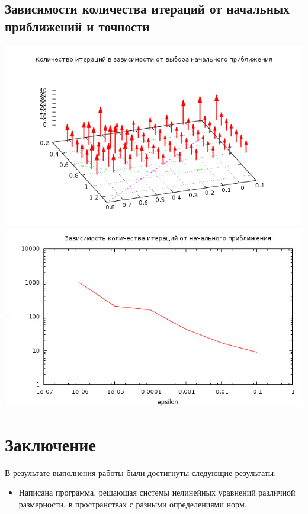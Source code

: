 \documentclass[a4paper, 12pt]{article}
\begin{document}
\subsection*{Зависимости количества итераций от начальных приближений и точности}
\includegraphics[width=\linewidth]{p0.png}
\includegraphics[width=\linewidth]{eps.jpg}
\newpage
\section*{Заключение}
В результате выполнения работы были достигнуты следующие результаты:\\
\begin{itemize}
	\item Написана программа, решающая системы нелинейных уравнений различной размерности, в пространствах с разными определениями норм.
\end{itemize}
\newpage
{}
\nocite{nm_verg_a}
\nocite{nm_verg_m}
\nocite{RH}
\nocite{RS}

\end{document}
